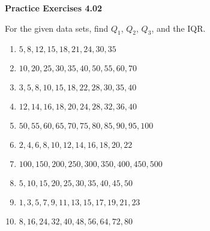 \vspace{0.3ex}
\noindent\textbf{Practice Exercises 4.02}

\vspace{0.2ex}

For the given data sets, find \(Q_1\), \(Q_2\), \(Q_3\), and the IQR. 

\begin{enumerate}
    \item \(5, 8, 12, 15, 18, 21, 24, 30, 35\)  
    \item \(10, 20, 25, 30, 35, 40, 50, 55, 60, 70\)  
    \item \(3, 5, 8, 10, 15, 18, 22, 28, 30, 35, 40\)  
    \item \(12, 14, 16, 18, 20, 24, 28, 32, 36, 40\)  
    \item \(50, 55, 60, 65, 70, 75, 80, 85, 90, 95, 100\)  
    \item \(2, 4, 6, 8, 10, 12, 14, 16, 18, 20, 22\)  
    \item \(100, 150, 200, 250, 300, 350, 400, 450, 500\)  
    \item \(5, 10, 15, 20, 25, 30, 35, 40, 45, 50\)  
    \item \(1, 3, 5, 7, 9, 11, 13, 15, 17, 19, 21, 23\)  
    \item \(8, 16, 24, 32, 40, 48, 56, 64, 72, 80\)  
\end{enumerate}
